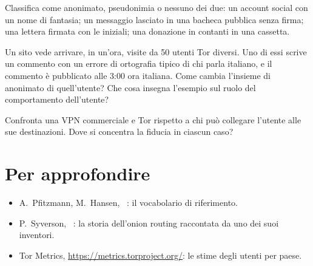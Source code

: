 \begin{esercizio}[1]\label{es:01-termini}
Classifica come anonimato, pseudonimia o nessuno dei due: un account social con un nome di fantasia; un messaggio lasciato in una bacheca pubblica senza firma; una lettera firmata con le iniziali; una donazione in contanti in una cassetta.
\end{esercizio}

\begin{esercizio}[2]\label{es:01-insieme}
Un sito vede arrivare, in un'ora, visite da 50 utenti Tor diversi. Uno di essi scrive un commento con un errore di ortografia tipico di chi parla italiano, e il commento è pubblicato alle 3:00 ora italiana. Come cambia l'insieme di anonimato di quell'utente? Che cosa insegna l'esempio sul ruolo del comportamento dell'utente?
\end{esercizio}

\begin{esercizio}[2]\label{es:01-vpn}
Confronta una VPN commerciale e Tor rispetto a chi può collegare l'utente alle sue destinazioni. Dove si concentra la fiducia in ciascun caso?
\end{esercizio}

\section*{Per approfondire}
\begin{itemize}
  \item A.~Pfitzmann, M.~Hansen, ~\cite{pfitzmann2010terminology}: il vocabolario di riferimento.
  \item P.~Syverson, ~\cite{syverson2011peel}: la storia dell'onion routing raccontata da uno dei suoi inventori.
  \item Tor Metrics, \url{https://metrics.torproject.org/}: le stime degli utenti per paese.
\end{itemize}
